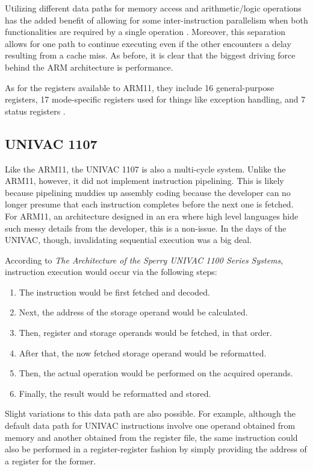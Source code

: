 \documentclass[onecolumn, draftclsnofoot, 10pt, compsoc]{IEEEtran}
\begin{document}
Utilizing different data paths for memory access and arithmetic/logic operations has the added benefit of allowing for some inter-instruction parallelism when both functionalities are required by a single operation \cite{armslides}. Moreover, this separation allows for one path to continue executing even if the other encounters a delay resulting from a cache miss. As before, it is clear that the biggest driving force behind the ARM architecture is performance.

As for the registers available to ARM11, they include 16 general-purpose registers, 17 mode-specific registers used for things like exception handling, and 7 status registers \cite{armslides}.

\subsection{UNIVAC 1107}
Like the ARM11, the UNIVAC 1107 is also a multi-cycle system. Unlike the ARM11, however, it did not implement instruction pipelining. This is likely because pipelining muddies up assembly coding because the developer can no longer presume that each instruction completes before the next one is fetched. For ARM11, an architecture designed in an era where high level languages hide such messy details from the developer, this is a non-issue. In the days of the UNIVAC, though, invalidating sequential execution was a big deal.

According to \textit{The Architecture of the Sperry UNIVAC 1100 Series Systems}, instruction execution would occur via the following steps:
\begin{enumerate}
\item The instruction would be first fetched and decoded.
\item Next, the address of the storage operand would be calculated.
\item Then, register and storage operands would be fetched, in that order.
\item After that, the now fetched storage operand would be reformatted.
\item Then, the actual operation would be performed on the acquired operands.
\item Finally, the result would be reformatted and stored.
\end{enumerate}
Slight variations to this data path are also possible. For example, although the default data path for UNIVAC instructions involve one operand obtained from memory and another obtained from the register file, the same instruction could also be performed in a register-register fashion by simply providing the address of a register for the former.
\end{document}
